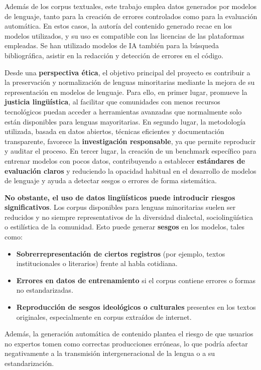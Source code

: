 Además de los corpus textuales, este trabajo emplea datos generados por modelos de lenguaje, tanto para la creación de errores controlados como para la evaluación automática. En estos casos, la autoría del contenido generado recae en los modelos utilizados, y su uso es compatible con las licencias de las plataformas empleadas. 
Se han utilizado modelos de IA también para la búsqueda bibliográfica, asistir en la redacción y detección de errores en el código.

Desde una \textbf{perspectiva ética}, el objetivo principal del proyecto es contribuir a la preservación y normalización de lenguas minoritarias mediante la mejora de su representación en modelos de lenguaje. 
Para ello, en primer lugar, promueve la \textbf{justicia lingüística}, al facilitar que comunidades con menos recursos tecnológicos puedan acceder a herramientas avanzadas que normalmente solo están disponibles para lenguas mayoritarias. En segundo lugar, la metodología utilizada, basada en datos abiertos, técnicas eficientes y documentación transparente, favorece la \textbf{investigación responsable}, ya que permite reproducir y auditar el proceso. En tercer lugar, la creación de un benchmark específico para entrenar modelos con pocos datos, contribuyendo a establecer \textbf{estándares de evaluación claros} y reduciendo la opacidad habitual en el desarrollo de modelos de lenguaje y ayuda a detectar sesgos o errores de forma sistemática. 

\textbf{No obstante, el uso de datos lingüísticos puede introducir riesgos significativos}. Los corpus disponibles para lenguas minoritarias suelen ser reducidos y no siempre representativos de la diversidad dialectal, sociolingüística o estilística de la comunidad. Esto puede generar \textbf{sesgos} en los modelos, tales como:
\begin{itemize}
    \item \textbf{Sobrerrepresentación de ciertos registros} (por ejemplo, textos institucionales o literarios) frente al habla cotidiana.
    \item \textbf{Errores en datos de entrenamiento} si el corpus contiene errores o formas no estandarizadas.
    \item \textbf{Reproducción de sesgos ideológicos o culturales} presentes en los textos originales, especialmente en corpus extraídos de internet.
\end{itemize}

Además, la generación automática de contenido plantea el riesgo de que usuarios no expertos tomen como correctas producciones erróneas, lo que podría afectar negativamente a la transmisión intergeneracional de la lengua o a su estandarización.


